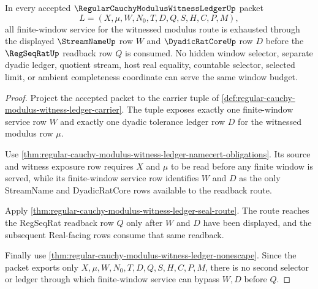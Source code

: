 \begin{theorem}
\label{thm:regular-cauchy-modulus-witness-ledger-window-budget-exhaustion}
In every accepted $\RegularCauchyModulusWitnessLedgerUp$ packet
$$
L=(X,\mu,W,N_0,T,D,Q,S,H,C,P,M),
$$
all finite-window service for the witnessed modulus route is exhausted through the displayed $\StreamNameUp$ row $W$ and $\DyadicRatCoreUp$ row $D$ before the $\RegSeqRatUp$ readback row $Q$ is consumed. No hidden window selector, separate dyadic ledger, quotient stream, host real equality, countable selector, selected limit, or ambient completeness coordinate can serve the same window budget.
\end{theorem}
\begin{proof}
Project the accepted packet to the carrier tuple of \autoref{def:regular-cauchy-modulus-witness-ledger-carrier}. The tuple exposes exactly one finite-window service row $W$ and exactly one dyadic tolerance ledger row $D$ for the witnessed modulus row $\mu$.

Use \autoref{thm:regular-cauchy-modulus-witness-ledger-namecert-obligations}. Its source and witness exposure row requires $X$ and $\mu$ to be read before any finite window is served, while its finite-window service row identifies $W$ and $D$ as the only StreamName and DyadicRatCore rows available to the readback route.

Apply \autoref{thm:regular-cauchy-modulus-witness-ledger-seal-route}. The route reaches the RegSeqRat readback row $Q$ only after $W$ and $D$ have been displayed, and the subsequent Real-facing rows consume that same readback.

Finally use \autoref{thm:regular-cauchy-modulus-witness-ledger-nonescape}. Since the packet exports only $X,\mu,W,N_0,T,D,Q,S,H,C,P,M$, there is no second selector or ledger through which finite-window service can bypass $W,D$ before $Q$.
\end{proof}

